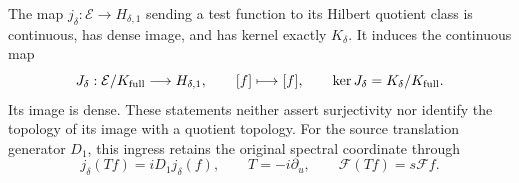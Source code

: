\begin{cqtheorem}
\label{csq:thm-sobolev-ingress}
The map $j_\delta:\mathcal E\to H_{\delta,1}$ sending a test function
to its Hilbert quotient class is continuous, has dense image, and
has kernel exactly $K_\delta$. It induces the continuous map
\begin{equation}\label{csq:eq-sobolev-quotient-map}
 J_\delta:\mathcal E/K_{\rm full}\longrightarrow H_{\delta,1},
 \qquad [f]\longmapsto[f],
 \qquad \ker J_\delta=K_\delta/K_{\rm full}.
\end{equation}
Its image is dense. These statements neither assert surjectivity
nor identify the topology of its image with a quotient topology.
For the source translation generator $D_1$, this ingress retains
the original spectral coordinate through
\begin{equation}\label{csq:eq-sobolev-generator}
 j_\delta(Tf)=iD_1j_\delta(f),
 \qquad T=-i\partial_u,\qquad \mathscr F(Tf)=s\mathscr Ff.
\end{equation}
\end{cqtheorem}
